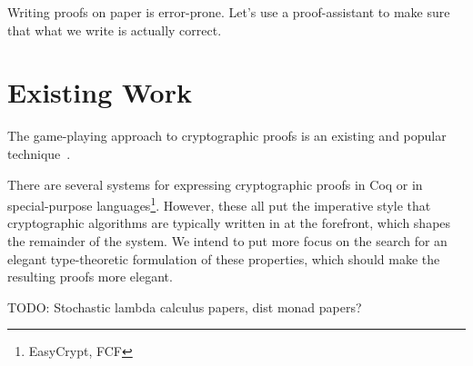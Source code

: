 Writing proofs on paper is error-prone.  Let's use a proof-assistant to make sure that what we write is actually
correct.

\section{Existing Work}

The game-playing approach to cryptographic proofs is an existing and popular technique~\cite{codebasedgames}.

There are several systems for expressing cryptographic proofs in Coq or in special-purpose
languages\footnote{EasyCrypt, FCF}.  However, these all put the imperative style that cryptographic algorithms are
typically written in at the forefront, which shapes the remainder of the system.  We intend to put more focus on the
search for an elegant type-theoretic formulation of these properties, which should make the resulting proofs more
elegant.

TODO: Stochastic lambda calculus papers, dist monad papers?
